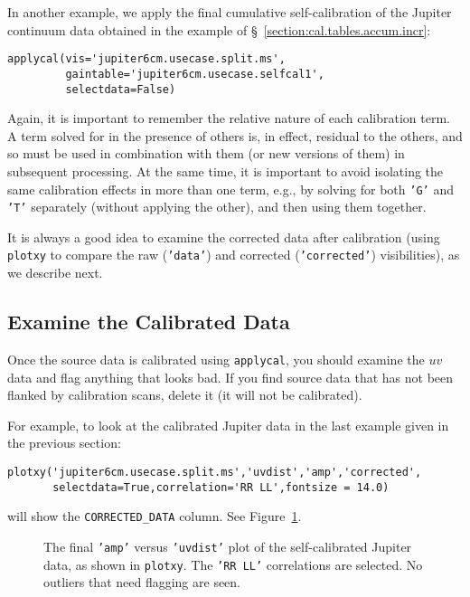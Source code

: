 In another example, we apply the final cumulative self-calibration 
of the Jupiter continuum data obtained in the example of
\S~\ref{section:cal.tables.accum.incr}:
\small
\begin{verbatim}
applycal(vis='jupiter6cm.usecase.split.ms',
         gaintable='jupiter6cm.usecase.selfcal1',
         selectdata=False)
\end{verbatim}
\normalsize

Again, it is important to remember the relative nature of each calibration
term.  A term solved for in the presence of others is, in effect,
residual to the others, and so must be used in combination with them
(or new versions of them) in subsequent processing.  At the same time,
it is important to avoid isolating the same calibration effects in
more than one term, e.g., by solving for both {\tt 'G'} and {\tt 'T'} 
separately (without applying the other), and then using them together.  

It is always a good idea to examine the corrected data after calibration
(using {\tt plotxy} to compare the raw ({\tt 'data'}) and corrected 
({\tt 'corrected'}) visibilities), as we describe next.

\subsection{Examine the Calibrated Data}
\label{section:cal.correct.exam}

Once the source data is calibrated using {\tt applycal}, 
you should examine the $uv$ data and flag anything that looks bad.  If
you find source data that has not been flanked by calibration scans,
delete it (it will not be calibrated).  

For example, to look at the calibrated Jupiter data in the last
example given in the previous section:
\small
\begin{verbatim}
plotxy('jupiter6cm.usecase.split.ms','uvdist','amp','corrected',
       selectdata=True,correlation='RR LL',fontsize = 14.0)
\end{verbatim}
\normalsize
will show the {\tt CORRECTED\_DATA} column.  See 
Figure~\ref{fig:applycal_jupiter}.

\begin{figure}[h!]
\begin{center}
\caption{\label{fig:applycal_jupiter} The final {\tt 'amp'} versus
{\tt 'uvdist'} plot of the self-calibrated Jupiter data, as shown
in {\tt plotxy}.  The {\tt 'RR LL'} correlations are selected.
No outliers that need flagging are seen. }
\hrulefill
\end{center}
\end{figure}

